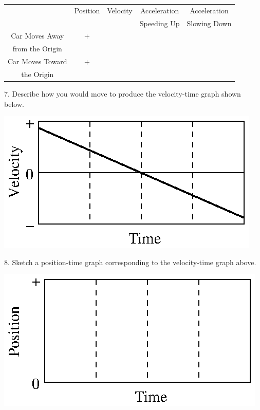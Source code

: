 \vspace{0.3cm}
{\centering \begin{tabular}{|c|c|c|c|c|}
\hline 
&
Position&
Velocity&
Acceleration&
Acceleration\\
&
&
&
Speeding Up&
Slowing Down\\
\hline 
Car Moves Away&
+&
&
&
\\
from the Origin&
&
&
&
\\
\hline 
Car Moves Toward&
+&
&
&
\\
the Origin&
&
&
&
\\
\hline 
\end{tabular}\par}
\vspace{0.3cm}

7. Describe how you would move to produce the velocity-time graph shown below.

\vspace{0.3cm}
{\par\raggedright \includegraphics{slowing/slowing_fig12.eps} \par}
\vspace{0.3cm}

8. Sketch a position-time graph corresponding to the velocity-time graph above.

\vspace{0.3cm}
{\par\centering \includegraphics{slowing/slowing_fig13.eps} \par}
\vspace{0.3cm}

